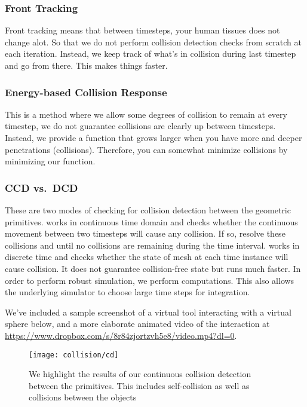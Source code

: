 \subsubsection{Front Tracking}
\label{sssec:front_tracking}
Front tracking means that between timesteps, your human tissues does not change alot. So that we do not perform collision detection checks from scratch at each iteration. Instead, we keep track of what's in collision during last timestep and go from there. This makes things faster.

\subsubsection{Energy-based Collision Response}
\label{sssec:energy_based_response}
This is a method where we allow some degrees of collision to remain at every timestep, \ie we do not guarantee collisions are clearly up between timesteps. Instead, we provide a function that grows larger when you have more and deeper penetrations (collisions). Therefore, you can somewhat minimize collisions by minimizing our function.

\subsubsection{CCD vs.\ DCD}
\label{sssec:ccd_vs_dcd}
These are two modes of checking for collision detection between the geometric primitives.  works in continuous time domain and checks whether the continuous movement between two timesteps will cause any  collision. If so, resolve these collisions and  until no collisions are remaining during the time interval.  works in discrete time and checks whether the state of mesh at each time instance will cause collision. It does not guarantee collision-free state but runs much faster. In order to perform robust simulation, we perform  computations. This also allows the underlying simulator to choose large time steps for integration.

We've included a sample screenshot of a virtual tool interacting with a virtual sphere below, and a more elaborate animated video of the interaction at \url{https://www.dropbox.com/s/8r84zjortzvh5e8/video.mp4?dl=0}.

\begin{figure}
  \centering%
	\texttt{[image: collision/cd]}
	\caption{We highlight the results of our continuous collision detection between the primitives. This includes self-collision as well as collisions between the objects}
	\label{fig:cd}
\end{figure}

